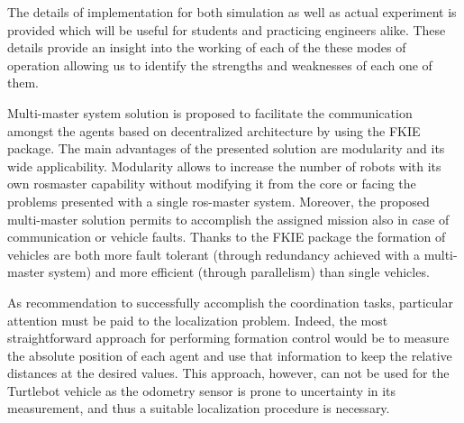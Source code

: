 \documentclass[journal]{IEEEtran}
\begin{document}
The details of implementation for both simulation as well
as actual experiment is provided which will be useful for
students and practicing engineers alike. These details provide
an insight into the working of each of the these modes of
operation allowing us to identify the strengths and weaknesses
of each one of them.

Multi-master system solution is proposed to facilitate the communication amongst the agents based on decentralized architecture by using the FKIE package. The main advantages of the presented solution are modularity and its wide applicability. Modularity allows to increase the number of robots with its own rosmaster capability without modifying it from the core or facing the problems presented with a single ros-master system.  Moreover, the proposed multi-master solution permits to accomplish the assigned mission also in case of communication or vehicle faults. Thanks to the FKIE package the formation of vehicles are both more fault tolerant (through redundancy achieved with a multi-master system) and more efficient (through parallelism) than single vehicles.


As recommendation to successfully accomplish the coordination tasks, particular attention must be paid to the localization problem. Indeed, the most straightforward approach for performing formation control would be to measure the absolute position of each agent and use that information to keep the relative distances at the desired values. This approach, however, can not be used for the Turtlebot vehicle as the odometry sensor is prone to uncertainty in its measurement, and thus a suitable localization procedure is necessary.
















\end{document}
